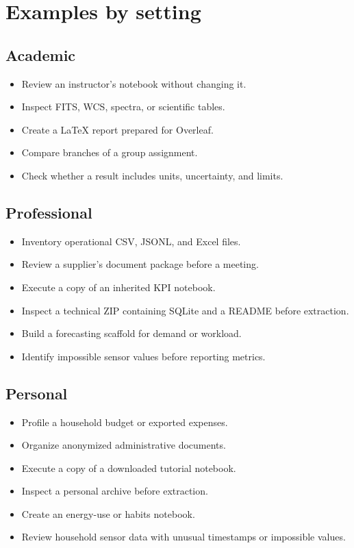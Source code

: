 \documentclass[11pt,a4paper]{article}
\begin{document}
\section{Examples by setting}
\subsection{Academic}
\begin{itemize}[leftmargin=1.5em]
\item Review an instructor's notebook without changing it.
\item Inspect FITS, WCS, spectra, or scientific tables.
\item Create a LaTeX report prepared for Overleaf.
\item Compare branches of a group assignment.
\item Check whether a result includes units, uncertainty, and limits.
\end{itemize}
\subsection{Professional}
\begin{itemize}[leftmargin=1.5em]
\item Inventory operational CSV, JSONL, and Excel files.
\item Review a supplier's document package before a meeting.
\item Execute a copy of an inherited KPI notebook.
\item Inspect a technical ZIP containing SQLite and a README before extraction.
\item Build a forecasting scaffold for demand or workload.
\item Identify impossible sensor values before reporting metrics.
\end{itemize}
\subsection{Personal}
\begin{itemize}[leftmargin=1.5em]
\item Profile a household budget or exported expenses.
\item Organize anonymized administrative documents.
\item Execute a copy of a downloaded tutorial notebook.
\item Inspect a personal archive before extraction.
\item Create an energy-use or habits notebook.
\item Review household sensor data with unusual timestamps or impossible values.
\end{itemize}
\end{document}
